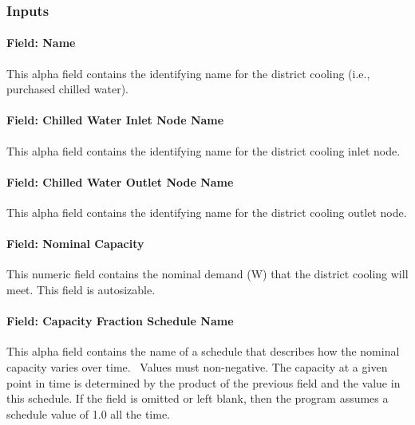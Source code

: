 \subsubsection{Inputs}\label{inputs-16-008}

\paragraph{Field: Name}\label{field-name-15-006}

This alpha field contains the identifying name for the district cooling (i.e., purchased chilled water).

\paragraph{Field: Chilled Water Inlet Node Name}\label{field-chilled-water-inlet-node-name-9}

This alpha field contains the identifying name for the district cooling inlet node.

\paragraph{Field: Chilled Water Outlet Node Name}\label{field-chilled-water-outlet-node-name-10}

This alpha field contains the identifying name for the district cooling outlet node.

\paragraph{Field: Nominal Capacity}\label{field-nominal-capacity-10}

This numeric field contains the nominal demand (W) that the district cooling will meet. This field is autosizable.

\paragraph{Field: Capacity Fraction Schedule Name}\label{field-capacity-fraction-schedule-name}

This alpha field contains the name of a schedule that describes how the nominal capacity varies over time.~ Values must non-negative. The capacity at a given point in time is determined by the product of the previous field and the value in this schedule. If the field is omitted or left blank, then the program assumes a schedule value of 1.0 all the time.

